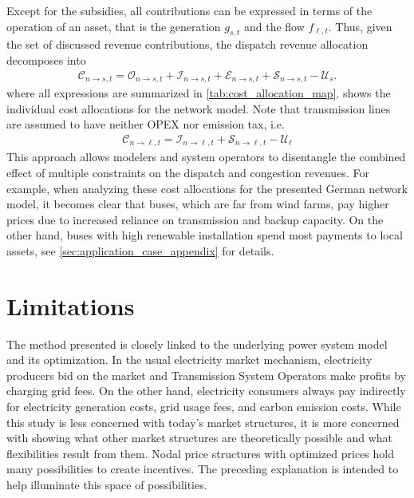 \documentclass[11pt,twocolumn]{article}
\newcommand{\ie}{i.e.}
\newcommand{\ra}{\rightarrow}
\newcommand{\generation}{g_{s,t}}
\newcommand{\flow}{f_{\ell,t}}
\newcommand{\cost}{\mathcal{C}}
\newcommand{\opex}{\mathcal{O}}
\newcommand{\capex}{\mathcal{I}}
\newcommand{\emissioncost}{\mathcal{E}}
\newcommand{\scarcitycost}{\mathcal{S}}
\newcommand{\subsidycost}{\mathcal{U}}
\newcommand{\allocategeneratorcost}[1][n \rightarrow s]{\cost_{#1, t}}
\newcommand{\allocatelinecost}[1][n \rightarrow \ell]{\cost_{#1, t}}
\newcommand{\allocatecapex}[1][n \rightarrow s,t]{\mathcal{I}_{#1}}
\newcommand{\allocateopex}[1][n \rightarrow s]{\opex_{#1,t}}
\newcommand{\allocateemissioncost}[1][n \rightarrow s]{\emissioncost_{#1,t}}
\newcommand{\allocatescarcitycost}[1][n \rightarrow s]{\scarcitycost_{#1,t}}
\begin{document}
Except for the subsidies, all contributions can be expressed in terms of the operation of an asset, that is the generation $\generation$ and the flow $\flow$. Thus, given the set of discussed revenue contributions, the dispatch revenue allocation decomposes into 
\begin{align}
    \allocategeneratorcost = \allocateopex + \allocatecapex + \allocateemissioncost + \allocatescarcitycost - \subsidycost_s .
\end{align} 
where all expressions are summarized in \cref{tab:cost_allocation_map}.  shows the individual cost allocations for the network model. Note that transmission lines are assumed to have neither \ac{OPEX} nor emission tax, \ie
\begin{align}
    \allocatelinecost = \capex_{n \ra \ell, t} + \scarcitycost_{n \ra \ell, t} - \subsidycost_\ell
\end{align}
This approach allows modelers and system operators to disentangle the combined effect of multiple constraints on the dispatch and congestion revenues. For example, when analyzing these cost allocations for the presented German network model, it becomes clear that buses, which are far from wind farms, pay higher prices due to increased reliance on transmission and backup capacity. On the other hand, buses with high renewable installation spend most payments to local assets, see \cref{sec:application_case_appendix} for details. 



\section{Limitations}
\label{sec:limitations}

The method presented is closely linked to the underlying power system model and its optimization. In the usual electricity market mechanism, electricity producers bid on the market and Transmission System Operators make profits by charging grid fees. On the other hand, electricity consumers always pay indirectly for electricity generation costs, grid usage fees, and carbon emission costs. 
While this study is less concerned with today's market structures, it is more concerned with showing what other market structures are theoretically possible and what flexibilities result from them. Nodal price structures with optimized prices hold many possibilities to create incentives. The preceding explanation is intended to help illuminate this space of possibilities.
\end{document}
